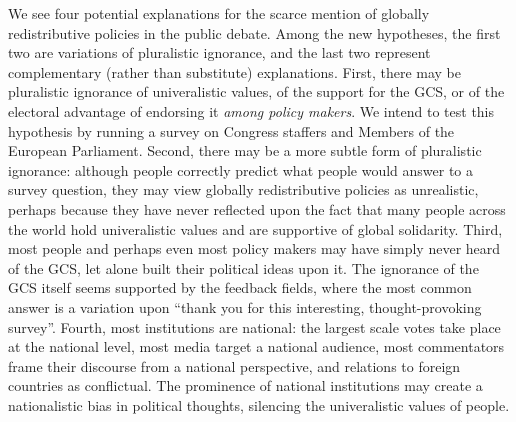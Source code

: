 We see four potential explanations for the scarce mention of globally redistributive policies in the public debate. Among the new hypotheses, the first two are variations of pluralistic ignorance, and the last two represent complementary (rather than substitute) explanations. First, there may be pluralistic ignorance of univeralistic values, of the support for the GCS, or of the electoral advantage of endorsing it \textit{among policy makers}. We intend to test this hypothesis by running a survey on Congress staffers and Members of the European Parliament. Second, there may be a more subtle form of pluralistic ignorance: although people correctly predict what people would answer to a survey question, they may view globally redistributive policies as unrealistic, perhaps because they have never reflected upon the fact that many people across the world hold univeralistic values and are supportive of global solidarity. Third, most people and perhaps even most policy makers may have simply never heard of the GCS, let alone built their political ideas upon it. The ignorance of the GCS itself seems supported by the feedback fields, where the most common answer is a variation upon ``thank you for this interesting, thought-provoking survey''. Fourth, most institutions are national: the largest scale votes take place at the national level, most media target a national audience, most commentators frame their discourse from a national perspective, and relations to foreign countries as conflictual. The prominence of national institutions may create a nationalistic bias in political thoughts, silencing the univeralistic values of people. %

